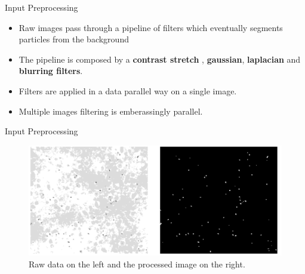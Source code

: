 \documentclass{beamer}
\begin{document}

\begin{frame}{Input Preprocessing}
				\begin{itemize}
					\item Raw images pass through a pipeline of filters which eventually segments particles from the background
					\item The pipeline is composed by a \textbf{contrast stretch} , \textbf{gaussian}, \textbf{laplacian }and \textbf{blurring filters}.
					\item Filters are applied in a data parallel way on a single image.
					\item Multiple images filtering is emberassingly parallel.
				\end{itemize}
	\end{frame}

	
	\begin{frame}{Input Preprocessing}
				\begin{figure}
					\centering
					\includegraphics[scale=0.20]{./images/preproc}
					\caption{Raw data on the left and the processed image on the right.}
				\end{figure}
	\end{frame}
\end{document}
